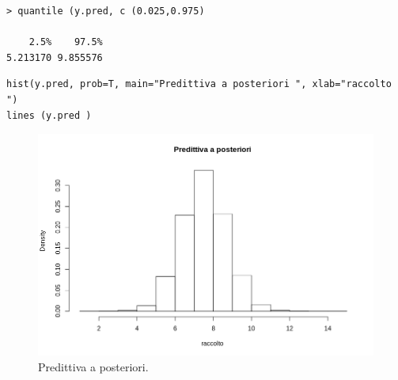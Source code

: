 {
\color{red}
\begin{Verbatim}
> quantile (y.pred, c (0.025,0.975) 

    2.5%    97.5%
5.213170 9.855576
\end{Verbatim}
}

\begin{lstlisting}[style=R]
hist(y.pred, prob=T, main="Predittiva a posteriori ", xlab="raccolto ")
lines (y.pred )
\end{lstlisting}

\begin{figure}
    \centering
    \includegraphics[totalheight=10cm]{img/esercizio11-2-6.png}
    \caption{   Predittiva a posteriori.}
\end{figure}
